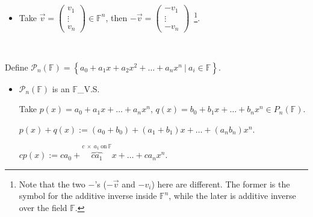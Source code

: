 \documentclass[11pt,fleqn]{book} %
\begin{document}
\begin{example}
\begin{itemize}
        \item Take $\vec{v} = \begin{pmatrix} v_1 \\ \vdots \\ v_n \end{pmatrix} \in \mathbb{F}^n$, then $-\vec{v} = \begin{pmatrix} -v_1 \\ \vdots \\ -v_n \end{pmatrix}$~\footnote{Note that the two $-$'s ($-\vec{v}$ and $-v_i$) here are different. The former is the symbol for the additive inverse inside $\mathbb{F}^n$, while the later is additive inverse over the field $\mathbb{F}$. }. 
    \end{itemize}
\end{example}

\begin{example}
{~~~}

    Define $\mathcal{P}_n(\mathbb{F}) = \left\{ a_0 + a_1x + a_2x^2 + \dots + a_nx^n ~|~a_i \in \mathbb{F} \right\}$. 
    
    \begin{itemize}
        \item $\mathcal{P}_n(\mathbb{F})$ is an $\mathbb{F}$\_V.S. 
        
        Take $p(x) = a_0 + a_1x + \dots + a_nx^n$, $q(x)=b_0 + b_1x + \dots + b_nx^n \in P_n(\mathbb{F})$. 
        
        $p(x)+q(x):=(a_0+b_0)+(a_1+b_1)x+\dots+(a_nb_n)x^n$. 
        
        $cp(x) := ca_0 + \overbrace{ca_1}^{c ~\times~ a_1 \mathrm{~on~}\mathbb{F}}x + \dots + ca_nx^n$. 
    \end{itemize}
\end{example}
\end{document}
